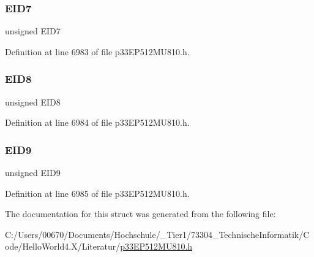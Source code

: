 \subsubsection{\texorpdfstring{E\+I\+D7}{EID7}}
{\footnotesize\ttfamily unsigned E\+I\+D7}



Definition at line 6983 of file p33\+E\+P512\+M\+U810.\+h.

\mbox{\label{structtag_c2_r_x_f13_e_i_d_b_i_t_s_acca25e0b7d86eb499d01f85222baea87}} 
\subsubsection{\texorpdfstring{E\+I\+D8}{EID8}}
{\footnotesize\ttfamily unsigned E\+I\+D8}



Definition at line 6984 of file p33\+E\+P512\+M\+U810.\+h.

\mbox{\label{structtag_c2_r_x_f13_e_i_d_b_i_t_s_ac6748f73d4ada8538b06548be4f396c2}} 
\subsubsection{\texorpdfstring{E\+I\+D9}{EID9}}
{\footnotesize\ttfamily unsigned E\+I\+D9}



Definition at line 6985 of file p33\+E\+P512\+M\+U810.\+h.



The documentation for this struct was generated from the following file\+:\begin{DoxyCompactItemize}
\item 
C\+:/\+Users/00670/\+Documents/\+Hochschule/\+\_\+\+Tier1/73304\+\_\+\+Technische\+Informatik/\+Code/\+Hello\+World4.\+X/\+Literatur/\hyperlink{p33_e_p512_m_u810_8h}{p33\+E\+P512\+M\+U810.\+h}\end{DoxyCompactItemize}
